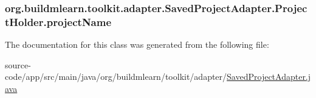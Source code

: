 \subsubsection[{\texorpdfstring{project\+Name}{projectName}}]{ org.\+buildmlearn.\+toolkit.\+adapter.\+Saved\+Project\+Adapter.\+Project\+Holder.\+project\+Name}\hypertarget{classorg_1_1buildmlearn_1_1toolkit_1_1adapter_1_1SavedProjectAdapter_1_1ProjectHolder_a4f7721be11f1285b0bcc94ac357179bb}{}\label{classorg_1_1buildmlearn_1_1toolkit_1_1adapter_1_1SavedProjectAdapter_1_1ProjectHolder_a4f7721be11f1285b0bcc94ac357179bb}


The documentation for this class was generated from the following file\+:\begin{DoxyCompactItemize}
\item 
source-\/code/app/src/main/java/org/buildmlearn/toolkit/adapter/\hyperlink{SavedProjectAdapter_8java}{Saved\+Project\+Adapter.\+java}\end{DoxyCompactItemize}
